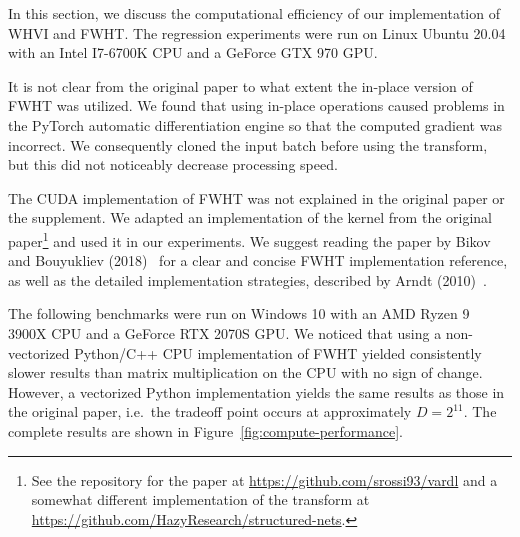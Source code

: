 
In this section, we discuss the computational efficiency of our implementation of WHVI and FWHT\@.
The regression experiments were run on Linux Ubuntu 20.04 with an Intel I7-6700K CPU and a GeForce GTX 970 GPU\@.

It is not clear from the original paper to what extent the in-place version of FWHT was utilized.
We found that using in-place operations caused problems in the PyTorch automatic differentiation engine so that the computed gradient was incorrect.
We consequently cloned the input batch before using the transform, but this did not noticeably decrease processing speed.

The CUDA implementation of FWHT was not explained in the original paper or the supplement.
We adapted an implementation of the kernel from the original paper\footnote{See the repository for the paper at \url{https://github.com/srossi93/vardl} and a somewhat different implementation of the transform at \url{https://github.com/HazyResearch/structured-nets}.} and used it in our experiments.
We suggest reading the paper by Bikov and Bouyukliev (2018)~\cite{bikov2018parallel} for a clear and concise FWHT implementation reference, as well as the detailed implementation strategies, described by Arndt (2010)~\cite{arndt2010matters}.

The following benchmarks were run on Windows 10 with an AMD Ryzen 9 3900X CPU and a GeForce RTX 2070S GPU\@.
We noticed that using a non-vectorized Python/C++ CPU implementation of FWHT yielded consistently slower results than matrix multiplication on the CPU with no sign of change.
However, a vectorized Python implementation yields the same results as those in the original paper, i.e.\ the tradeoff point occurs at approximately $D = 2^{11}$.
The complete results are shown in Figure~\ref{fig:compute-performance}.

